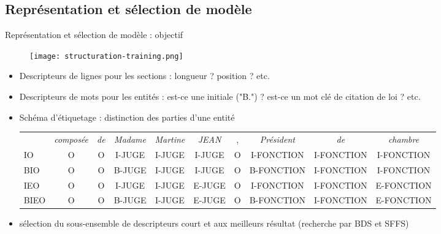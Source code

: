 \subsection{Représentation et sélection de modèle}
\begin{frame}{Représentation et sélection de modèle : objectif}
		\begin{figure}
			\texttt{[image: structuration-training.png]}
		\end{figure}
	\begin{itemize} \scriptsize
		\item Descripteurs de lignes pour les sections : longueur ? position ? etc.
		\item Descripteurs de mots pour les entités : est-ce une initiale ("B.") ? est-ce un mot clé de citation de loi ? etc.
		\item Schéma d'étiquetage : distinction des parties d'une entité \tiny
		\begin{tabular}{l|ccccccccc}
			& \textit{composée} & \textit{de} & \textit{Madame} & \textit{Martine} & \textit{JEAN} & , & \textit{Président} & \textit{de} & \textit{chambre} \\ 
			IO & O & O & I-JUGE & I-JUGE & I-JUGE & O & I-FONCTION & I-FONCTION & I-FONCTION \\
			BIO & O & O & B-JUGE & I-JUGE & I-JUGE & O & B-FONCTION & I-FONCTION & I-FONCTION \\
			IEO & O & O & I-JUGE & I-JUGE & E-JUGE & O & I-FONCTION & I-FONCTION & E-FONCTION\\
			BIEO & O & O & B-JUGE & I-JUGE & E-JUGE & O & B-FONCTION & I-FONCTION & E-FONCTION \\
		\end{tabular}
		\item \scriptsize sélection du sous-ensemble de descripteurs court et aux meilleurs résultat (recherche par BDS et SFFS)
	\end{itemize}	
\end{frame}
